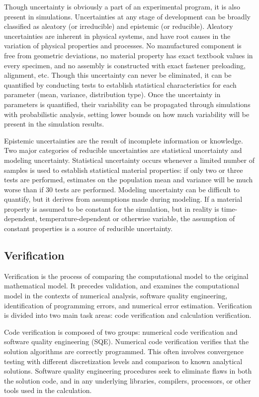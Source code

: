 Though uncertainty is obviously a part of an experimental program, it is also present in simulations.
Uncertainties at any stage of development can be broadly classified as aleatory (or irreducible) and epistemic (or reducible).
Aleatory uncertainties are inherent in physical systems, and have root causes in the variation of physical properties and processes.
No manufactured component is free from geometric deviations, no material property has exact textbook values in every specimen, and no assembly is constructed with exact fastener preloading, alignment, etc.
Though this uncertainty can never be eliminated, it can be quantified by conducting tests to establish statistical characteristics for each parameter (mean, variance, distribution type).
Once the uncertainty in parameters is quantified, their variability can be propagated through simulations with probabilistic analysis, setting lower bounds on how much variability will be present in the simulation results.

Epistemic uncertainties are the result of incomplete information or knowledge.
Two major categories of reducible uncertainties are statistical uncertainty and modeling uncertainty.
Statistical uncertainty occurs whenever a limited number of samples is used to establish statistical material properties: if only two or three tests are performed, estimates on the population mean and variance will be much worse than if 30 tests are performed.
Modeling uncertainty can be difficult to quantify, but it derives from assumptions made during modeling.
If a material property is assumed to be constant for the simulation, but in reality is time-dependent, temperature-dependent or otherwise variable, the assumption of constant properties is a source of reducible uncertainty.

\subsection{Verification}

Verification is the process of comparing the computational model to the original mathematical model.
It precedes validation, and examines the computational model in the contexts of numerical analysis, software quality engineering, identification of programming errors, and numerical error estimation.
Verification is divided into two main task areas: code verification and calculation verification.

Code verification is composed of two groups: numerical code verification and software quality engineering (SQE).
Numerical code verification verifies that the solution algorithms are correctly programmed.
This often involves convergence testing with different discretization levels and comparison to known analytical solutions.
Software quality engineering procedures seek to eliminate flaws in both the solution code, and in any underlying libraries, compilers, processors, or other tools used in the calculation.

